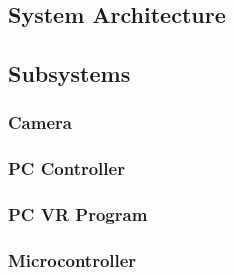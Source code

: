 \documentclass[titlepage]{article}
\begin{document}
\subsection{System Architecture}
\subsection{Subsystems}
\subsubsection{Camera}
\subsubsection{PC Controller}
\subsubsection{PC VR Program}
\subsubsection{Microcontroller}


\pagebreak
\printindex
\end{document}
